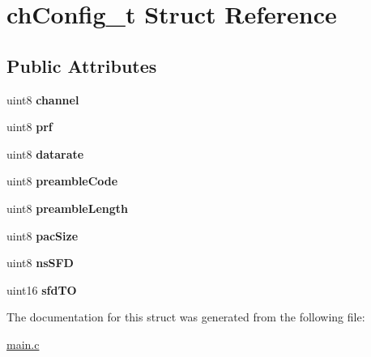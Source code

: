 \hypertarget{structchConfig__t}{\section{ch\-Config\-\_\-t Struct Reference}
\label{structchConfig__t}
}
\subsection*{Public Attributes}
\begin{DoxyCompactItemize}
\item 
\hypertarget{structchConfig__t_a6257ee7fd966a3cd78329f43b915c150}{uint8 {\bfseries channel}}\label{structchConfig__t_a6257ee7fd966a3cd78329f43b915c150}

\item 
\hypertarget{structchConfig__t_ab604c2cda1dc005dd3bd5205671571b9}{uint8 {\bfseries prf}}\label{structchConfig__t_ab604c2cda1dc005dd3bd5205671571b9}

\item 
\hypertarget{structchConfig__t_a1deb6a4b3b259e4736a537e15e0774aa}{uint8 {\bfseries datarate}}\label{structchConfig__t_a1deb6a4b3b259e4736a537e15e0774aa}

\item 
\hypertarget{structchConfig__t_a830e408d22f68b7dc7bbdf371c2cfa5f}{uint8 {\bfseries preamble\-Code}}\label{structchConfig__t_a830e408d22f68b7dc7bbdf371c2cfa5f}

\item 
\hypertarget{structchConfig__t_a24650627d644ec848590dbaa096cdf52}{uint8 {\bfseries preamble\-Length}}\label{structchConfig__t_a24650627d644ec848590dbaa096cdf52}

\item 
\hypertarget{structchConfig__t_ab6adfe9e1d2088aa7526e8b6b56b27dc}{uint8 {\bfseries pac\-Size}}\label{structchConfig__t_ab6adfe9e1d2088aa7526e8b6b56b27dc}

\item 
\hypertarget{structchConfig__t_aeeb4ef9f279e7ee9884d4c6bde81f270}{uint8 {\bfseries ns\-S\-F\-D}}\label{structchConfig__t_aeeb4ef9f279e7ee9884d4c6bde81f270}

\item 
\hypertarget{structchConfig__t_ad951a70c3adbf281b992b5f865d140a7}{uint16 {\bfseries sfd\-T\-O}}\label{structchConfig__t_ad951a70c3adbf281b992b5f865d140a7}

\end{DoxyCompactItemize}


The documentation for this struct was generated from the following file\-:\begin{DoxyCompactItemize}
\item 
\hyperlink{main_8c}{main.\-c}\end{DoxyCompactItemize}
